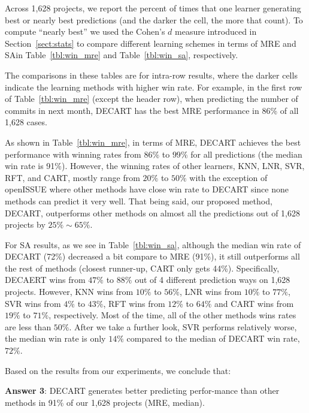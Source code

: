 \documentclass[sigconf,anonymous,review]{acmart}
\newcommand{\tbl}[1]{Table~\ref{tbl:#1}}
\begin{document}
Across 1,628 projects, we report the percent of times that one learner generating best or nearly best predictions (and the darker the cell, the more that count).  To compute ``nearly best'' we used the Cohen's $d$ measure introduced in Section~\ref{sect:stats} to compare different learning schemes in terms of MRE and SAin \tbl{win_mre} and \tbl{win_sa}, respectively.  

 The comparisons in these tables are for intra-row results, where the darker cells indicate the learning methods with higher win rate. For example, in the first row of \tbl{win_mre} (except the header row), when predicting the number of commits in next month, DECART has the best MRE performance in 86\% of all 1,628 cases. 

As shown in \tbl{win_mre}, in terms of MRE, DECART achieves the best performance with winning rates from $86\%$ to $99\%$ for all predictions (the median win rate is 91\%). However, the winning rates of other learners, KNN, LNR, SVR, RFT, and CART, mostly range from $20\%$ to $50\%$ with the exception of openISSUE where other methods have close win rate to DECART since none methods can predict it very well. That being said, our proposed method, DECART, outperforms other methods on almost all the predictions out of 1,628 projects by $25\% \sim 65\%$.


For SA results, as we see in \tbl{win_sa}, although the median win rate of DECART (72\%) decreased a bit compare to MRE (91\%), it still outperforms all the rest of methods (closest runner-up, CART only gets 44\%). Specifically, DECAERT wins from $47\%$ to $88\%$ out of 4 different prediction ways on 1,628 projects. However, KNN wins from $10\%$ to $56\%$, LNR wins from $10\%$ to $77\%$, SVR wins from $4\%$ to $43\%$, RFT wins from $12\%$ to $64\%$ and CART wins from $19\%$ to $71\%$, respectively. Most of the time, all of the other methods wins rates are less than $50\%$. After we take a further look, SVR performs relatively worse, the median win rate is only $14\%$ compared to the median of DECART win rate, $72\%$. 




Based on the results from our experiments, we conclude that:
 

\begin{blockquote}
\noindent
\textbf{Answer 3}: 
DECART generates better predicting perfor-mance than other methods in 91\% of our 1,628 projects (MRE, median).
\end{blockquote}
\end{document}
